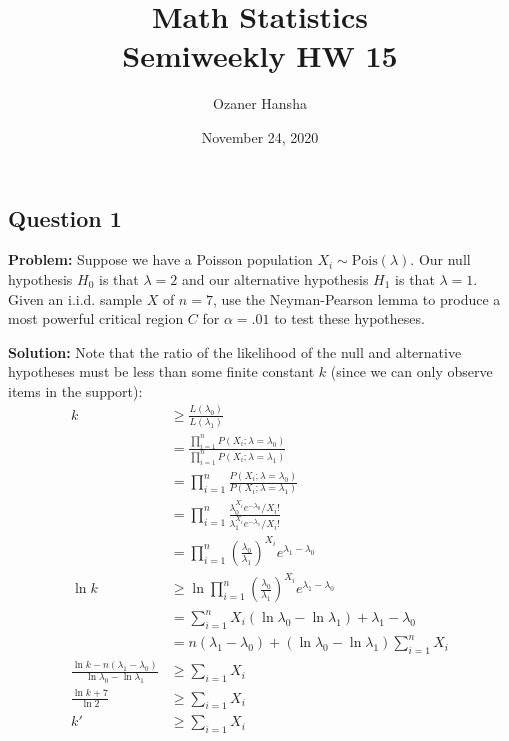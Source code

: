 \documentclass{article}
\begin{document}
\title{Math Statistics\\ Semiweekly HW 15}
\author{Ozaner Hansha}
\date{November 24, 2020}
\maketitle

\subsection*{Question 1}
\noindent\textbf{Problem:} Suppose we have a Poisson population $X_i\sim\text{Pois}(\lambda)$. Our null hypothesis $H_0$ is that $\lambda=2$ and our alternative hypothesis $H_1$ is that $\lambda=1$. Given an i.i.d. sample $X$ of $n=7$, use the Neyman-Pearson lemma to produce a most powerful critical region $C$ for $\alpha=.01$ to test these hypotheses.
\bigskip


\noindent\textbf{Solution:} Note that the ratio of the likelihood of the null and alternative hypotheses must be less than some finite constant $k$ (since we can only observe items in the support):
\begin{align*}
    k&\ge\frac{L(\lambda_0)}{L(\lambda_1)}\\
    &=\frac{\prod_{i=1}^nP(X_i;\lambda=\lambda_0)}{\prod_{i=1}^nP(X_i;\lambda=\lambda_1)}\tag{def. of likelihood}\\
    &=\prod_{i=1}^n\frac{P(X_i;\lambda=\lambda_0)}{P(X_i;\lambda=\lambda_1)}\tag{associativity}\\
    &=\prod_{i=1}^n\frac{\lambda_0^{X_i}e^{-\lambda_0}/X_i!}{\lambda_1^{X_i}e^{-\lambda_1}/X_i!}\tag{pmf of Poisson RV}\\
    &=\prod_{i=1}^n\left(\frac{\lambda_0}{\lambda_1}\right)^{X_i}e^{\lambda_1-\lambda_0}\\
    \ln k&\ge\ln\prod_{i=1}^n\left(\frac{\lambda_0}{\lambda_1}\right)^{X_i}e^{\lambda_1-\lambda_0}\tag{$\ln$ is monotone increasing}\\
    &=\sum_{i=1}^nX_i(\ln\lambda_0-\ln\lambda_1)+\lambda_1-\lambda_0\\
    &=n(\lambda_1-\lambda_0)+(\ln\lambda_0-\ln\lambda_1)\sum_{i=1}^nX_i\\
    \frac{\ln k-n(\lambda_1-\lambda_0)}{\ln\lambda_0-\ln\lambda_1}&\ge\sum_{i=1}X_i\\
    \frac{\ln k+7}{\ln2}&\ge\sum_{i=1}X_i\\
    k'&\ge\sum_{i=1}X_i\tag{let LHS $=k'$}
\end{align*}
\end{document}
